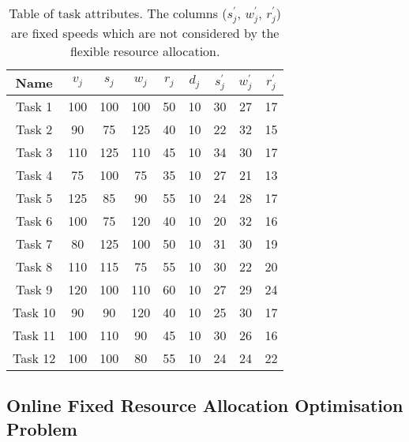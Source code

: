 \begin{table}[h]
    \begin{tabular}{|c|c|c|c|c|c|c|c|c|}
        \hline
        Name    & $v_j$ & $s_j$ & $w_j$ & $r_j$ & $d_j$ & $s^{'}_j$ & $w^{'}_j$ & $r^{'}_j$ \\ [0.5ex] \hline
        Task 1  & 100   & 100   & 100   & 50    & 10    & 30        & 27        & 17        \\ \hline
        Task 2  & 90    & 75    & 125   & 40    & 10    & 22        & 32        & 15        \\ \hline
        Task 3  & 110   & 125   & 110   & 45    & 10    & 34        & 30        & 17        \\ \hline
        Task 4  & 75    & 100   & 75    & 35    & 10    & 27        & 21        & 13        \\ \hline
        Task 5  & 125   & 85    & 90    & 55    & 10    & 24        & 28        & 17        \\ \hline
        Task 6  & 100   & 75    & 120   & 40    & 10    & 20        & 32        & 16        \\ \hline
        Task 7  & 80    & 125   & 100   & 50    & 10    & 31        & 30        & 19        \\ \hline
        Task 8  & 110   & 115   & 75    & 55    & 10    & 30        & 22        & 20        \\ \hline
        Task 9  & 120   & 100   & 110   & 60    & 10    & 27        & 29        & 24        \\ \hline
        Task 10 & 90    & 90    & 120   & 40    & 10    & 25        & 30        & 17        \\ \hline
        Task 11 & 100   & 110   & 90    & 45    & 10    & 30        & 26        & 16        \\ \hline
        Task 12 & 100   & 100   & 80    & 55    & 10    & 24        & 24        & 22        \\ \hline
    \end{tabular}
    \caption{Table of task attributes. The columns ($s^{'}_j$, $w^{'}_j$, $r^{'}_j$) are fixed speeds which are not
    considered by the flexible resource allocation.}
    \label{tab:example-tasks-properties}
\end{table}

\subsection*{Online Fixed Resource Allocation Optimisation Problem}

